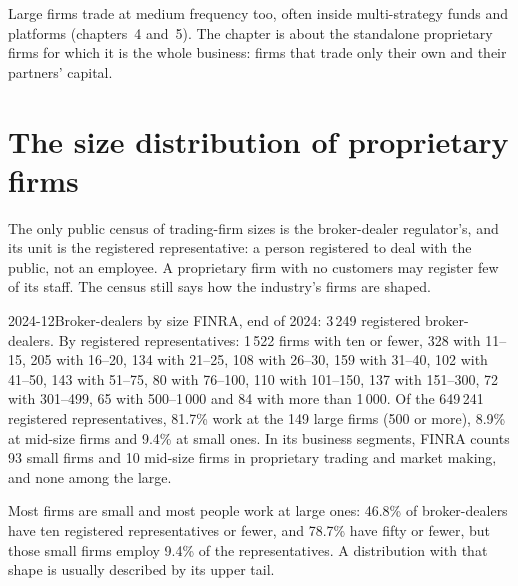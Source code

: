 \begin{remark}\label{rem:in:medium-frequency-proprietary-shops:large}
Large firms trade at medium frequency too, often inside multi-strategy funds and platforms (chapters~4 and~5). The
chapter is about the standalone proprietary firms for which it is the whole business: firms that trade only their own
and their partners' capital.
\end{remark}

\section{The size distribution of proprietary firms}

The only public census of trading-firm sizes is the broker-dealer regulator's, and its unit is the registered
representative: a person registered to deal with the public, not an employee. A proprietary firm with no customers may
register few of its staff. The census still says how the industry's firms are shaped.

\begin{dated}{2024-12}{Broker-dealers by size}\label{dat:in:medium-frequency-proprietary-shops:sizes}
FINRA, end of 2024: 3\,249 registered broker-dealers. By registered representatives: 1\,522 firms with ten or fewer,
328 with 11--15, 205 with 16--20, 134 with 21--25, 108 with 26--30, 159 with 31--40, 102 with 41--50, 143 with 51--75, 80 with
76--100, 110 with 101--150, 137 with 151--300, 72 with 301--499, 65 with 500--1\,000 and 84 with more than 1\,000. Of the
649\,241 registered representatives, 81.7\% work at the 149 large firms (500 or more), 8.9\% at mid-size firms and
9.4\% at small ones. In its business segments, FINRA counts 93 small firms and 10 mid-size firms in proprietary trading
and market making, and none among the large.
\end{dated}

Most firms are small and most people work at large ones: 46.8\% of broker-dealers have ten registered representatives
or fewer, and 78.7\% have fifty or fewer, but those small firms employ 9.4\% of the representatives. A distribution
with that shape is usually described by its upper tail.

